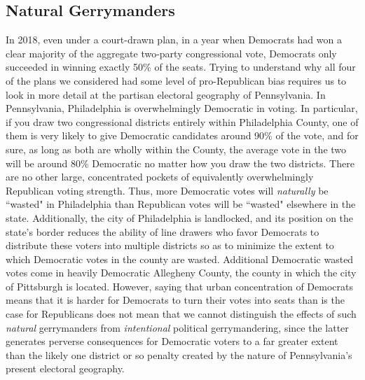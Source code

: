 \par
    \subsection*{Natural Gerrymanders}
    In 2018, even under a court-drawn plan, in a year when Democrats had won a clear majority of the aggregate two-party congressional vote, Democrats only succeeded in winning exactly 50\% of the seats. Trying to understand why all four of the plans we considered had some level of pro-Republican bias requires us to look in more detail at the partisan electoral geography of Pennsylvania. In Pennsylvania, Philadelphia is overwhelmingly Democratic in voting. In particular, if you draw two congressional districts entirely within Philadelphia County, one of them is very likely to give Democratic candidates around 90\% of the vote, and for sure, as long as both are wholly within the County, the average vote in the two will be around 80\% Democratic no matter how you draw the two districts. There are no other large, concentrated pockets of equivalently overwhelmingly Republican voting strength. Thus, more Democratic votes will \textit{naturally} be ``wasted" in Philadelphia than Republican votes will be ``wasted" elsewhere in the state. Additionally, the city of Philadelphia is landlocked, and its position on the state's border reduces the ability of line drawers who favor Democrats to distribute these voters into multiple districts so as to minimize the extent to which Democratic votes in the county are wasted. Additional Democratic wasted votes come in heavily Democratic Allegheny County, the county in which the city of Pittsburgh is located. However, saying that urban concentration of Democrats means that it is harder for Democrats to turn their votes into seats than is the case for Republicans does not mean that we cannot distinguish the effects of such \textit{natural} gerrymanders from \textit{intentional} political gerrymandering, since the latter generates perverse consequences for Democratic voters to a far greater extent than the likely one district or so penalty created by the nature of Pennsylvania’s present electoral geography. 
